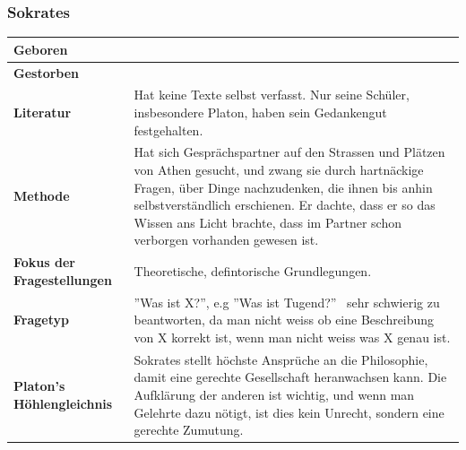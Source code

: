 			
		\subsubsection{Sokrates}
			\begin{longtable}{>{\bfseries}p{}p{}}
				\hline
				Geboren
					& \\
				\hline
				Gestorben
					& \\
				\hline
				Literatur
					& Hat keine Texte selbst verfasst.\newline
						Nur seine Schüler, insbesondere Platon, haben sein Gedankengut festgehalten.\\
				\hline
				Methode
					& Hat sich Gesprächspartner auf den Strassen und Plätzen von Athen gesucht, und zwang sie durch hartnäckige Fragen, über Dinge nachzudenken, die ihnen bis anhin selbstverständlich erschienen.\newline
						Er dachte, dass er so das Wissen ans Licht brachte, dass im Partner schon verborgen vorhanden gewesen ist.\\
				\hline
				Fokus der Fragestellungen
					& Theoretische, defintorische Grundlegungen.\\
				\hline
				Fragetyp
					& ''Was ist X?'', e.g ''Was ist Tugend?''\newline
						\textrightarrow\ sehr schwierig zu beantworten, da man nicht weiss ob eine Beschreibung von X korrekt ist, wenn man nicht weiss was X genau ist.\\
				\hline
				Platon's Höhlengleichnis
					& Sokrates stellt höchste Ansprüche an die Philosophie, damit eine gerechte Gesellschaft heranwachsen kann. Die Aufklärung der anderen ist wichtig, und wenn man Gelehrte dazu nötigt, ist dies kein Unrecht, sondern eine gerechte Zumutung.\\
				\hline
			\end{longtable}	
			
			
